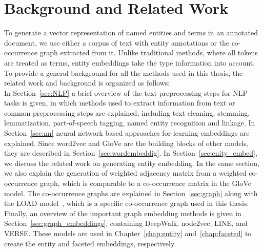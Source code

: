 
\chapter{Background and Related Work}\label{chap:background}
To generate a vector representation of named entities and terms in an annotated document, we use either a corpus of text with entity annotations or the co-occurrence graph extracted from it. Unlike traditional methods, where all tokens are treated as terms, entity embeddings take the type information into account. To provide a general background for all the methods used in this thesis, the related work and background is organized as follows:\\
In Section~\ref{sec:NLP} a brief overview of the text preprocessing steps for NLP tasks is given, in which methods used to extract information from text or common preprocessing steps are explained, including text cleaning, stemming, lemmatization, part-of-speech tagging, named entity recognition and linkage.  In Section~\ref{sec:nn} neural network based approaches for learning embeddings are explained. Since word2vec and GloVe are the building blocks of other models, they are described in Section~\ref{sec:wordembeddig}.  In Section~\ref{sec:enity_embed}, we discuss the related work on generating entity embedding.  In the same section, we also explain the generation of  weighted adjacency matrix from a weighted co-occurrence graph, which is comparable to a co-occurrence matrix in the GloVe model. The co-occurrence graphs are explained in Section~\ref{sec:graph} along with the LOAD model~, which is a specific co-occurrence graph used in this thesis. Finally, an overview of the important graph embedding methods is given in Section~\ref{sec:graph_embeddings}, containing DeepWalk, node2vec, LINE, and VERSE. These models are used  in Chapter~\ref{chap:entity} and~\ref{chap:faceted} to create the entity and faceted embeddings, respectively. 

